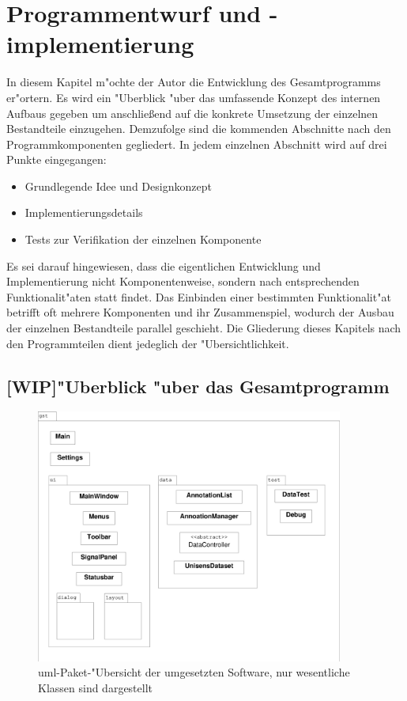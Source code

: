 \chapter{Programmentwurf und -implementierung}
\label{chap:entwurf}

In diesem Kapitel m"ochte der Autor die Entwicklung des Gesamtprogramms er"ortern.
Es wird ein "Uberblick "uber das umfassende Konzept des internen Aufbaus gegeben um anschlie\ss end auf die konkrete Umsetzung der einzelnen Bestandteile einzugehen.
Demzufolge sind die kommenden Abschnitte nach den Programmkomponenten gegliedert.
In jedem einzelnen Abschnitt wird auf drei Punkte eingegangen:
\begin{itemize}
	\item Grundlegende Idee und Designkonzept
	\item Implementierungsdetails
	\item Tests zur Verifikation der einzelnen Komponente
\end{itemize}
Es sei darauf hingewiesen, dass die eigentlichen Entwicklung und Implementierung nicht Komponentenweise, sondern nach entsprechenden Funktionalit"aten statt findet.
Das Einbinden einer bestimmten Funktionalit"at betrifft oft mehrere Komponenten und ihr Zusammenspiel, wodurch der Ausbau der einzelnen Bestandteile parallel geschieht.
Die Gliederung dieses Kapitels nach den Programmteilen dient jedeglich der "Ubersichtlichkeit.

\section{[WIP]"Uberblick "uber das Gesamtprogramm}

\begin{figure}[htb]
\centering
\includegraphics[width=0.9\textwidth]{bilder/prog_ubersicht.eps}
\caption[\acs{uml}-Paket-"Ubersicht der umgesetzten Software]{\ac{uml}-Paket-"Ubersicht der umgesetzten Software, nur wesentliche Klassen sind dargestellt}
\label{pic:paket_ubersicht}
\end{figure}

